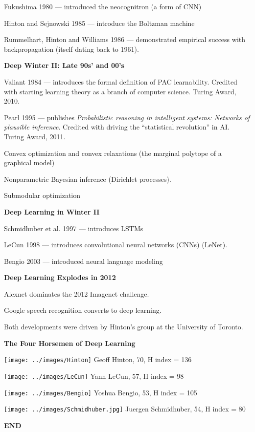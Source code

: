 \documentclass[landscape]{article}
\newcommand{\slide}[1]{\vfill
\eject
\centerline{\bf #1}
\vfill}
\begin{document}
{Fukushima 1980 --- introduced the neocognitron (a form of CNN)

\vfill
Hinton and Sejnowski 1985 --- introduce the Boltzman machine

\vfill
Rummelhart, Hinton and Williams 1986 --- demonstrated empirical success with backpropagation (itself dating back to 1961).

\slide{Deep Winter II: Late 90s' and 00's}

Valiant 1984 --- introduces the formal definition of PAC learnability.  Credited with starting learning theory as a branch of
computer science.  Turing Award, 2010.

\vfill
Pearl 1995 --- publishes {\it Probabilistic reasoning in intelligent systems: Networks of plausible inference}. Credited with driving the
``statistical revolution'' in AI.  Turing Award, 2011.

\vfill
Convex optimization and convex relaxations (the marginal polytope of a graphical model)

\vfill
Nonparametric Bayesian inference (Dirichlet processes).

\vfill
Submodular optimization

\slide{Deep Learning in Winter II}

Schmidhuber et al. 1997 --- introduces LSTMs

\vfill
LeCun 1998 --- introduces convolutional neural networks (CNNs) (LeNet).

\vfill
Bengio 2003 --- introduced neural language modeling

\slide{Deep Learning Explodes in 2012}

Alexnet dominates the 2012 Imagenet challenge.

\vfill
Google speech recognition converts to deep learning.

\vfill
Both developments were driven by Hinton's group at the University of Toronto.


\slide{The Four Horsemen of Deep Learning}

\texttt{[image: ../images/Hinton]} Geoff Hinton, 70, H index = 136

\vfill
\texttt{[image: ../images/LeCun]} Yann LeCun, 57, H index = 98

\vfill
\texttt{[image: ../images/Bengio]} Yoshua Bengio, 53, H index = 105

\vfill
\texttt{[image: ../images/Schmidhuber.jpg]} Juergen Schmidhuber, 54, H index = 80

\slide{END}

}
\end{document}
